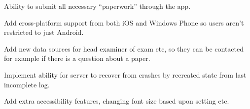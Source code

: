 Ability to submit all necessary ``paperwork'' through the app.

Add cross-platform support from both iOS and Windows Phone so users aren't restricted to just Android.

Add new data sources for head examiner of exam etc, so they can be contacted for example if there is a question about a paper.

Implement ability for server to recover from crashes by recreated state from last incomplete log.

Add extra accessibility features, changing font size based upon setting etc.